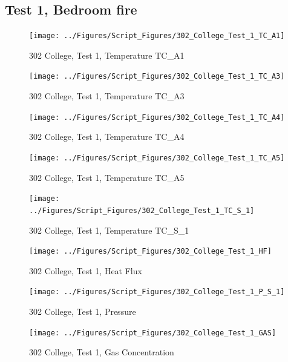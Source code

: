 \documentclass[12pt,oneside]{book}
\begin{document}
\subsection{Test 1, Bedroom fire}

\begin{figure}[!ht]
\texttt{[image: ../Figures/Script\_Figures/302\_College\_Test\_1\_TC\_A1]}
\caption{302 College, Test 1, Temperature TC\_A1}
\label{fig:302_College_Test_1_TC_A1}
\end{figure}

\begin{figure}[!ht]
\texttt{[image: ../Figures/Script\_Figures/302\_College\_Test\_1\_TC\_A3]}
\caption{302 College, Test 1, Temperature TC\_A3}
\label{fig:302_College_Test_1_TC_A3}
\end{figure}

\begin{figure}[!ht]
\texttt{[image: ../Figures/Script\_Figures/302\_College\_Test\_1\_TC\_A4]}
\caption{302 College, Test 1, Temperature TC\_A4}
\label{fig:302_College_Test_1_TC_A4}
\end{figure}

\begin{figure}[!ht]
\texttt{[image: ../Figures/Script\_Figures/302\_College\_Test\_1\_TC\_A5]}
\caption{302 College, Test 1, Temperature TC\_A5}
\label{fig:302_College_Test_1_TC_A5}
\end{figure}

\begin{figure}[!ht]
\texttt{[image: ../Figures/Script\_Figures/302\_College\_Test\_1\_TC\_S\_1]}
\caption{302 College, Test 1, Temperature TC\_S\_1}
\label{fig:302_College_Test_1_TC_S_1}
\end{figure}

\begin{figure}[!ht]
\texttt{[image: ../Figures/Script\_Figures/302\_College\_Test\_1\_HF]}
\caption{302 College, Test 1, Heat Flux}
\label{fig:302_College_Test_1_HF}
\end{figure}

\begin{figure}[!ht]
\texttt{[image: ../Figures/Script\_Figures/302\_College\_Test\_1\_P\_S\_1]}
\caption{302 College, Test 1, Pressure}
\label{fig:302_College_Test_1_P_S_1}
\end{figure}

\begin{figure}[!ht]
\texttt{[image: ../Figures/Script\_Figures/302\_College\_Test\_1\_GAS]}
\caption{302 College, Test 1, Gas Concentration}
\label{fig:302_College_Test_1_GAS}
\end{figure}
\end{document}
